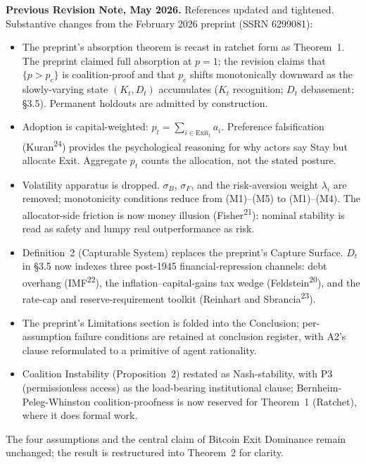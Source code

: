 \documentclass[12pt]{article}
\theoremstyle{definition}
\theoremstyle{remark}
\providecommand{\DIFaddtex}[1]{{\color{AddedText}#1}}
\providecommand{\DIFaddend}{}
\providecommand{\DIFadd}[1]{\texorpdfstring{\DIFaddtex{#1}}{#1}} %
\begin{document}
\smallskip

\noindent\DIFadd{\textbf{Previous Revision Note, May 2026.}
}\DIFaddend References updated and tightened. Substantive changes from the February 2026 preprint (SSRN 6299081):

\smallskip

\begin{itemize}
\item The preprint's absorption theorem is recast in ratchet form as Theorem~1. The preprint claimed full absorption at $p = 1$; the revision claims that $\{p > p_c\}$ is coalition-proof and that $p_c$ shifts monotonically downward as the slowly-varying state $(K_t, D_t)$ accumulates ($K_t$ recognition; $D_t$ debasement; \S3.5). Permanent holdouts are admitted by construction.
\item Adoption is capital-weighted: $p_t = \sum_{i \in \text{Exit}_t} a_i$. Preference falsification (Kuran\textsuperscript{24}) provides the psychological reasoning for why actors say Stay but allocate Exit. Aggregate $p_t$ counts the allocation, not the stated posture.
\item Volatility apparatus is dropped. $\sigma_B$, $\sigma_F$, and the risk-aversion weight $\lambda_i$ are removed; monotonicity conditions reduce from (M1)--(M5) to (M1)--(M4). The allocator-side friction is now money illusion (Fisher\textsuperscript{21}): nominal stability is read as safety and lumpy real outperformance as risk.
\item Definition~2 (Capturable System) replaces the preprint's Capture Surface. $D_t$ in \S3.5 now indexes three post-1945 financial-repression channels: debt overhang (IMF\textsuperscript{22}), the inflation--capital-gains tax wedge (Feldstein\textsuperscript{20}), and the rate-cap and reserve-requirement toolkit (Reinhart and Sbrancia\textsuperscript{23}).
\item The preprint's Limitations section is folded into the Conclusion; per-assumption failure conditions are retained at conclusion register, with A2's clause reformulated to a primitive of agent rationality.
\item Coalition Instability (Proposition~2) restated as Nash-stability, with P3 (permissionless access) as the load-bearing institutional clause; Bernheim-Peleg-Whinston coalition-proofness is now reserved for Theorem~1 (Ratchet), where it does formal work.
\end{itemize}

\smallskip

\noindent The four assumptions and the central claim of Bitcoin Exit Dominance remain unchanged; the result is restructured into Theorem~2 for clarity.
\end{document}
